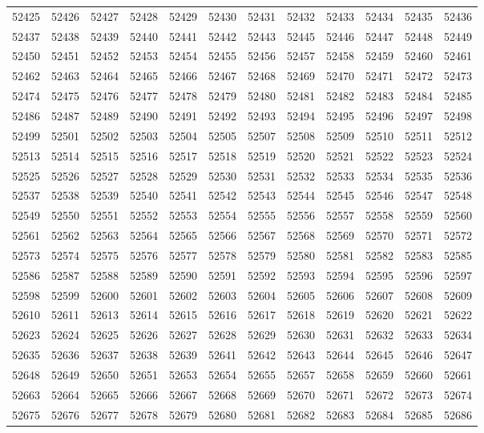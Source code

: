 \begin{center}
\begin{longtable}{llllllllllll}
52425 &52426 &52427 &52428 &52429 &52430 &52431 &52432 &52433 &52434 &52435 &52436 \\
52437 &52438 &52439 &52440 &52441 &52442 &52443 &52445 &52446 &52447 &52448 &52449 \\
52450 &52451 &52452 &52453 &52454 &52455 &52456 &52457 &52458 &52459 &52460 &52461 \\
52462 &52463 &52464 &52465 &52466 &52467 &52468 &52469 &52470 &52471 &52472 &52473 \\
52474 &52475 &52476 &52477 &52478 &52479 &52480 &52481 &52482 &52483 &52484 &52485 \\
52486 &52487 &52489 &52490 &52491 &52492 &52493 &52494 &52495 &52496 &52497 &52498 \\
52499 &52501 &52502 &52503 &52504 &52505 &52507 &52508 &52509 &52510 &52511 &52512 \\
52513 &52514 &52515 &52516 &52517 &52518 &52519 &52520 &52521 &52522 &52523 &52524 \\
52525 &52526 &52527 &52528 &52529 &52530 &52531 &52532 &52533 &52534 &52535 &52536 \\
52537 &52538 &52539 &52540 &52541 &52542 &52543 &52544 &52545 &52546 &52547 &52548 \\
52549 &52550 &52551 &52552 &52553 &52554 &52555 &52556 &52557 &52558 &52559 &52560 \\
52561 &52562 &52563 &52564 &52565 &52566 &52567 &52568 &52569 &52570 &52571 &52572 \\
52573 &52574 &52575 &52576 &52577 &52578 &52579 &52580 &52581 &52582 &52583 &52585 \\
52586 &52587 &52588 &52589 &52590 &52591 &52592 &52593 &52594 &52595 &52596 &52597 \\
52598 &52599 &52600 &52601 &52602 &52603 &52604 &52605 &52606 &52607 &52608 &52609 \\
52610 &52611 &52613 &52614 &52615 &52616 &52617 &52618 &52619 &52620 &52621 &52622 \\
52623 &52624 &52625 &52626 &52627 &52628 &52629 &52630 &52631 &52632 &52633 &52634 \\
52635 &52636 &52637 &52638 &52639 &52641 &52642 &52643 &52644 &52645 &52646 &52647 \\
52648 &52649 &52650 &52651 &52653 &52654 &52655 &52657 &52658 &52659 &52660 &52661 \\
52663 &52664 &52665 &52666 &52667 &52668 &52669 &52670 &52671 &52672 &52673 &52674 \\
52675 &52676 &52677 &52678 &52679 &52680 &52681 &52682 &52683 &52684 &52685 &52686 \\

\end{longtable}
\end{center}

